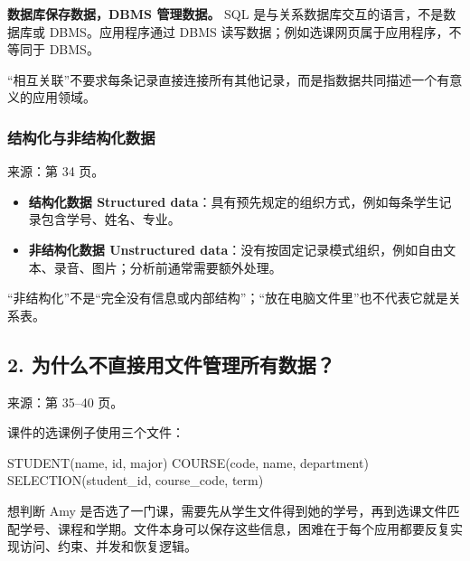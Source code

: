 \textbf{数据库保存数据，DBMS 管理数据。} SQL 是与关系数据库交互的语言，不是数据库或 DBMS。应用程序通过 DBMS 读写数据；例如选课网页属于应用程序，不等同于 DBMS。

``相互关联''不要求每条记录直接连接所有其他记录，而是指数据共同描述一个有意义的应用领域。

\subsubsection{结构化与非结构化数据}\label{01_database_fundamentals_zh-ux7ed3ux6784ux5316ux4e0eux975eux7ed3ux6784ux5316ux6570ux636e}

来源：第 34 页。

\begin{itemize}
\tightlist
\item
  \textbf{结构化数据 Structured data}：具有预先规定的组织方式，例如每条学生记录包含学号、姓名、专业。
\item
  \textbf{非结构化数据 Unstructured data}：没有按固定记录模式组织，例如自由文本、录音、图片；分析前通常需要额外处理。
\end{itemize}

``非结构化''不是``完全没有信息或内部结构''；``放在电脑文件里''也不代表它就是关系表。

\subsection{2. 为什么不直接用文件管理所有数据？}\label{01_database_fundamentals_zh-ux4e3aux4ec0ux4e48ux4e0dux76f4ux63a5ux7528ux6587ux4ef6ux7ba1ux7406ux6240ux6709ux6570ux636e}

来源：第 35--40 页。

课件的选课例子使用三个文件：

\begin{StudyCode}
STUDENT(name, id, major)
COURSE(code, name, department)
SELECTION(student_id, course_code, term)
\end{StudyCode}

想判断 Amy 是否选了一门课，需要先从学生文件得到她的学号，再到选课文件匹配学号、课程和学期。文件本身可以保存这些信息，困难在于每个应用都要反复实现访问、约束、并发和恢复逻辑。

